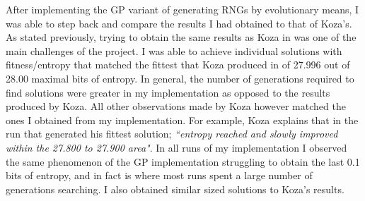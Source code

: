 \documentclass[a4paper,10.5pt]{article}
\begin{document}
After implementing the GP variant of generating RNGs by evolutionary means, I was able to step back and compare the results I had obtained to that of Koza's. As stated previously, trying to obtain the same results as Koza in \cite{kozarng} was one of the main challenges of the project. I was able to achieve individual solutions with fitness/entropy that matched the fittest that Koza produced in \cite[p.6]{kozarng} of 27.996 out of 28.00 maximal bits of entropy. In general, the number of generations required to find solutions were greater in my implementation as opposed to the results produced by Koza. All other observations made by Koza however matched the ones I obtained from my implementation. For example, Koza explains that in the run that generated his fittest solution; \emph{``entropy reached and slowly improved within the 27.800 to 27.900 area"}. In all runs of my implementation I observed the same phenomenon of the GP implementation struggling to obtain the last 0.1 bits of entropy, and in fact is where most runs spent a large number of generations searching. I also obtained similar sized solutions to Koza's results.
\end{document}
